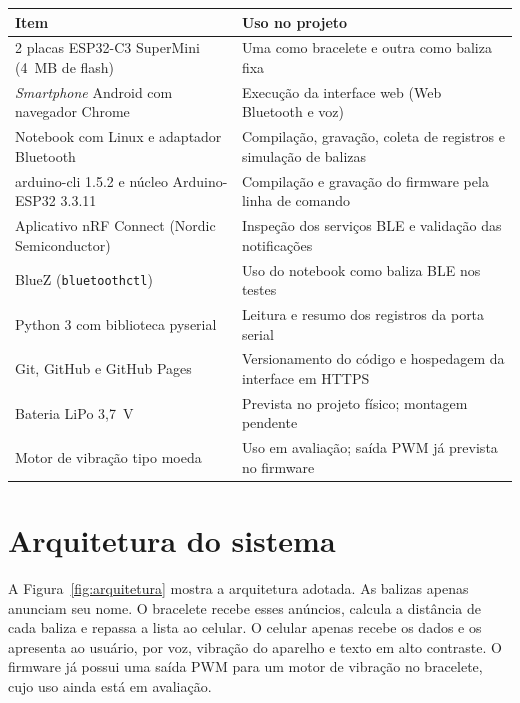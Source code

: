 \begin{quadro}[htb]
\caption{Materiais e ferramentas utilizados}
\label{qua:materiais}
\small
\begin{tabular}{|p{5.8cm}|p{8.2cm}|}
\hline
\textbf{Item} & \textbf{Uso no projeto} \\
\hline
2 placas ESP32-C3 SuperMini (4~MB de flash) & Uma como bracelete e outra como baliza fixa \\
\hline
\textit{Smartphone} Android com navegador Chrome & Execução da interface web (Web Bluetooth e voz) \\
\hline
Notebook com Linux e adaptador Bluetooth & Compilação, gravação, coleta de registros e simulação de balizas \\
\hline
arduino-cli 1.5.2 e núcleo Arduino-ESP32 3.3.11 & Compilação e gravação do firmware pela linha de comando \\
\hline
Aplicativo nRF Connect (Nordic Semiconductor) & Inspeção dos serviços BLE e validação das notificações \\
\hline
BlueZ (\texttt{bluetoothctl}) & Uso do notebook como baliza BLE nos testes \\
\hline
Python 3 com biblioteca pyserial & Leitura e resumo dos registros da porta serial \\
\hline
Git, GitHub e GitHub Pages & Versionamento do código e hospedagem da interface em HTTPS \\
\hline
Bateria LiPo 3,7~V & Prevista no projeto físico; montagem pendente \\
\hline
Motor de vibração tipo moeda & Uso em avaliação; saída PWM já prevista no firmware \\
\hline
\end{tabular}
\normalsize
{}
\end{quadro}

\section{Arquitetura do sistema}
\label{sec:arquitetura}

A Figura~\ref{fig:arquitetura} mostra a arquitetura adotada. As balizas apenas anunciam seu nome. O bracelete recebe esses anúncios, calcula a distância de cada baliza e repassa a lista ao celular. O celular apenas recebe os dados e os apresenta ao usuário, por voz, vibração do aparelho e texto em alto contraste. O firmware já possui uma saída PWM para um motor de vibração no bracelete, cujo uso ainda está em avaliação.

